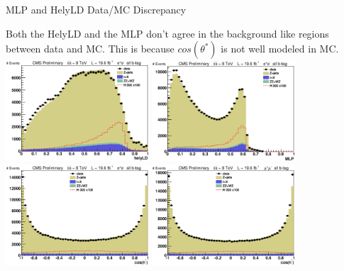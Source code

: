


\begin{frame}{MLP and HelyLD Data/MC Discrepancy}
\begin{center}
Both the HelyLD and the MLP don't agree in the background like regions between data and MC. This is because $cos(\theta^{*})$ is not well modeled in MC.
\includegraphics[width=0.4\textwidth]{images/preselection/el/helyLD.eps}
\includegraphics[width=0.4\textwidth]{images/preselection/el/MLP.eps}\\
\includegraphics[width=0.4\textwidth]{images/preselection/el/costhetast.eps}
\includegraphics[width=0.4\textwidth]{images/preselection/mu/costhetast.eps}
\end{center}
\end{frame}

